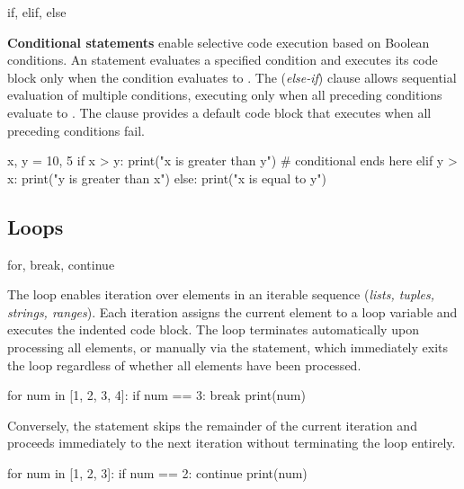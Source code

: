 \documentclass[10pt]{article}
\begin{document}
    \begin{core}{if, elif, else}

      \textbf{Conditional statements} enable selective code execution based on Boolean conditions. An  statement evaluates a specified condition and executes its code block only when the condition evaluates to . The  (\textit{else-if}) clause allows sequential evaluation of multiple conditions, executing only when all preceding conditions evaluate to . The  clause provides a default code block that executes when all preceding conditions fail.

      \begin{pyconsole}

        x, y = 10, 5
        if x > y:
            print("x is greater than y") # conditional ends here
        elif y > x:
            print("y is greater than x")
        else:
            print("x is equal to y")

      \end{pyconsole}

    \end{core}

  \subsection{Loops}

    \begin{core}[label=core:for]{for, break, continue}

      The  loop enables iteration over elements in an iterable sequence (\textit{lists, tuples, strings, ranges}). Each iteration assigns the current element to a loop variable and executes the indented code block. The loop terminates automatically upon processing all elements, or manually via the  statement, which immediately exits the loop regardless of whether all elements have been processed.

      \begin{pyconsole}

        for num in [1, 2, 3, 4]:
            if num == 3:
                break
            print(num)

      \end{pyconsole}

      Conversely, the  statement skips the remainder of the current iteration and proceeds immediately to the next iteration without terminating the loop entirely.

      \begin{pyconsole}

        for num in [1, 2, 3]:
            if num == 2:
                continue
            print(num)

      \end{pyconsole}

    \end{core}
\end{document}
